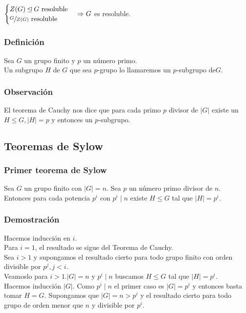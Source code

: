 \documentclass[11pt,a4paper]{article}
\begin{document}
$\begin{cases}
Z(G) \unlhd G \text{ resoluble} \\
\sfrac{G}{Z(G)} \text{ resoluble}
\end{cases}
\Rightarrow G$ es resoluble.

\subsubsection*{Definición}

Sea $G$ un grupo finito y $p$ un número primo. \\
Un subgrupo $H$ de $G$ que sea $p$-grupo lo llamaremos un $p$-subgrupo de$G$.

\subsubsection*{Observación}

El teorema de Cauchy nos dice que para cada primo $p$ divisor de $|G|$ existe un $H \leqslant G, |H| = p$ y entonces un $p$-subgrupo.

\subsection{Teoremas de Sylow}

\subsubsection*{Primer teorema de Sylow}

Sea $G$ un grupo finito con $|G| = n$. Sea $p$ un número primo divisor de $n$. \\
Entonces para cada potencia $p^{i}$ con $p^{i} \mid n$ existe $H \leqslant G$ tal que $|H| = p^{i}$.

\subsubsection*{Demostración}

Hacemos inducción en $i$. \\
Para $i = 1$, el resultado se sigue del Teorema de Cauchy. \\
Sea $i > 1$ y supongamos el resultado cierto para todo grupo finito con orden divisible por $p^{j}, j < i$. \\
Veamoslo para $i > 1. |G| = n$ y $p^{i} \mid n$ buscamos $H \leqslant G$ tal que $|H| = p^{i}$. \\
Hacemos inducción $|G|$. Como $p^{i} \mid n$ el primer caso es $|G| = p^{i}$ y entonces basta tomar $H = G$. Supongamos que $|G| = n > p^{i}$ y el resultado cierto para todo grupo de orden menor que $n$ y divisible por $p^{i}$.
\end{document}
